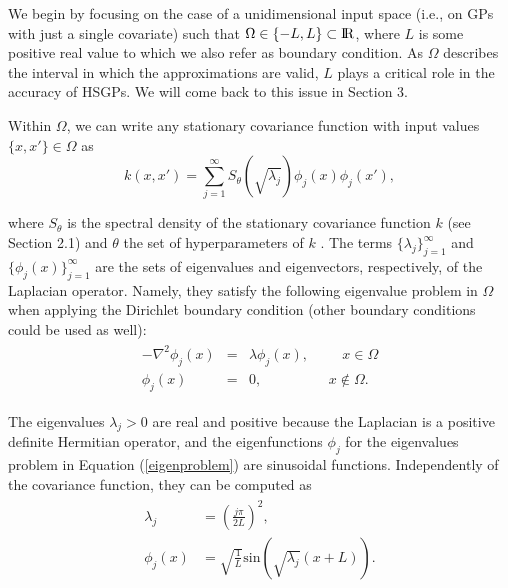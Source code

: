\documentclass[]{interact}
\theoremstyle{plain}%
\theoremstyle{definition}
\theoremstyle{remark}
\begin{document}
We begin by focusing on the case of a unidimensional input space (i.e., on GPs with just a single covariate) such that $\Omega \in \{-L,L\} \subset {\rm I\!R}$, where $L$ is some positive real value to which we also refer as boundary condition. As $\Omega$ describes the interval in which the approximations are valid, $L$ plays a critical role in the accuracy of HSGPs. We will come back to this issue in Section 3.

Within $\Omega$, we can write any stationary covariance function with input values $\{x,x'\} \in \Omega$ as 
%
\begin{equation}\label{approxcov}
k(x,x') = \sum_{j=1}^\infty S_{\theta}(\sqrt{\lambda_j}) \phi_j(x) \phi_j(x'),
\end{equation} 

\noindent where $S_{\theta}$ is the spectral density of the stationary covariance function $k$ (see Section 2.1) and $\theta$ the set of hyperparameters of $k$ \citep{rasmussen2006gaussian}. The terms $\{\lambda_j\}_{j=1}^{\infty}$ and $\{\phi_j(x)\}_{j=1}^{\infty}$ are the sets of eigenvalues and eigenvectors, respectively, of the Laplacian operator. Namely, they satisfy the following eigenvalue problem in $\Omega$ when applying the Dirichlet boundary condition (other boundary conditions could be used as well):
%
\begin{eqnarray}\label{eigenproblem}
\begin{split}
-\nabla^2 \phi_j(x)&=&\lambda \phi_j(x), \hspace{1cm}  x \in \Omega \\ 
\phi_j(x)&=&0, \hspace{2cm} x \notin \Omega.
\end{split}
\end{eqnarray} 

\noindent The eigenvalues $\lambda_j>0$ are real and positive because the Laplacian is a positive definite Hermitian operator, and the eigenfunctions $\phi_j$ for the eigenvalues problem in Equation (\ref{eigenproblem}) are sinusoidal functions. Independently of the covariance function, they can be computed as
%
\begin{eqnarray}\label{bf&lambda}
\begin{split}
\lambda_j&=\left(\frac{j\pi}{2L}\right)^2, \\
\phi_j(x)&=\sqrt{\frac{1}{L}} \text{sin}\left(\sqrt{\lambda_j}(x+L)\right).
\end{split}
\end{eqnarray}
\end{document}

